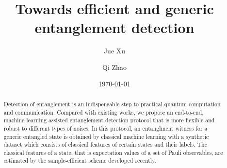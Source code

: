 \documentclass[
aps,
pra,
twocolumn,
floatfix,
]{revtex4-2}
\theoremstyle{plain}
\theoremstyle{definition}
\begin{document}
\title{Towards efficient and generic entanglement detection}
\author{Jue Xu}
\author{Qi Zhao}
\date{\today}
\begin{abstract}
	Detection of entanglement is an indispensable step to practical quantum computation and communication.
	Compared with existing works, we propose an end-to-end, machine learning assisted entanglement detection protocol that is more flexible and robust to different types of noises.
	In this protocol, an entanglment witness for a generic entangled state is obtained by classical machine learning with a synthetic dataset which consists of classical features of certain states and their labels. 
	The classical features of a state, that is expectation values of a set of  Pauli observables, are estimated by the sample-efficient scheme developed recently.
\end{abstract}

\maketitle

\end{document}
